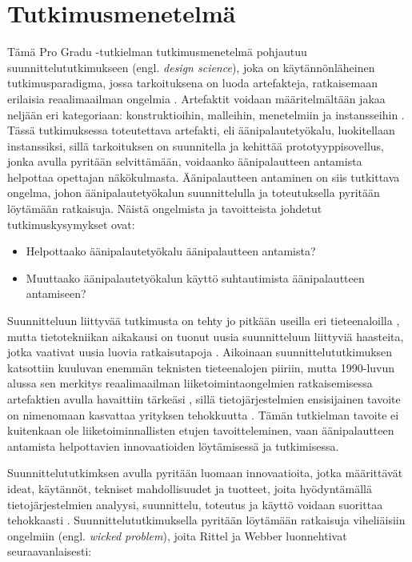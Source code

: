 \documentclass[utf8]{gradu3}
\begin{document}
%

\chapter{Tutkimusmenetelmä}

Tämä Pro Gradu -tutkielman tutkimusmenetelmä pohjautuu suunnittelututkimukseen (engl. \textit{design science}), joka on käytännönläheinen tutkimusparadigma, jossa tarkoituksena on luoda artefakteja, ratkaisemaan erilaisia reaalimaailman ongelmia \parencite[][]{hevner2004}. Artefaktit voidaan määritelmältään jakaa neljään eri kategoriaan: konstruktioihin, malleihin, menetelmiin ja instansseihin \parencite[][]{hevner2004}. Tässä tutkimuksessa toteutettava artefakti, eli äänipalautetyökalu, luokitellaan instanssiksi, sillä tarkoituksen on suunnitella ja kehittää prototyyppisovellus, jonka avulla pyritään selvittämään, voidaanko äänipalautteen antamista helpottaa opettajan näkökulmasta. Äänipalautteen antaminen on siis tutkittava ongelma, johon äänipalautetyökalun suunnittelulla ja toteutuksella pyritään löytämään ratkaisuja. Näistä ongelmista ja tavoitteista johdetut tutkimuskysymykset ovat:

\begin{itemize}
  \item Helpottaako äänipalautetyökalu äänipalautteen antamista?
  \item Muuttaako äänipalautetyökalun käyttö suhtautimista äänipalautteen antamiseen?
\end{itemize}

Suunnitteluun liittyvää tutkimusta on tehty jo pitkään useilla eri tieteenaloilla \parencite[][]{cross2001}, mutta tietotekniikan aikakausi on tuonut uusia suunnitteluun liittyviä haasteita, jotka vaativat uusia luovia ratkaisutapoja \parencite[][]{design}. Aikoinaan suunnittelututkimuksen katsottiin kuuluvan enemmän teknisten tieteenalojen piiriin, mutta 1990-luvun alussa sen merkitys reaalimaailman liiketoimintaongelmien ratkaisemisessa artefaktien avulla havaittiin tärkeäsi \parencite[][]{design}, sillä tietojärjestelmien ensisijainen tavoite on nimenomaan kasvattaa yrityksen tehokkuutta \parencite[][]{hevner2004}. Tämän tutkielman tavoite ei kuitenkaan ole liiketoiminnallisten etujen tavoitteleminen, vaan äänipalautteen antamista helpottavien innovaatioiden löytämisessä ja tutkimisessa.

Suunnittelututkimksen avulla pyritään luomaan innovaatioita, jotka määrittävät ideat, käytännöt, tekniset mahdollisuudet ja tuotteet, joita hyödyntämällä tietojärjestelmien analyysi, suunnittelu, toteutus ja käyttö voidaan suorittaa tehokkaasti \parencite[][]{hevner2004}. Suunnittelututkimuksella pyritään löytämään ratkaisuja viheliäisiin ongelmiin (engl. \textit{wicked problem}), joita Rittel ja Webber \parencite[][]{wicked} luonnehtivat seuraavanlaisesti: 
\end{document}
